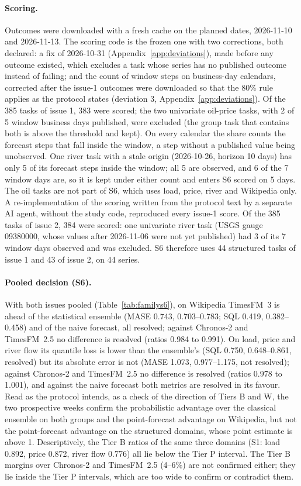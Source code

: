 \paragraph{Scoring.} Outcomes were downloaded with a fresh cache on the planned dates, 2026-11-10 and 2026-11-13. The scoring code is the
frozen one with two corrections, both declared: a fix of 2026-10-31 (Appendix~\ref{app:deviations}), made before any outcome existed, which excludes a task whose
series has no published outcome instead of failing; and the count of window steps on business-day calendars, corrected after the
issue-1 outcomes were downloaded so that the 80\% rule applies as the protocol states (deviation 3, Appendix~\ref{app:deviations}).
Of the 385 tasks of issue 1, 383 were scored; the two univariate oil-price tasks, with 2 of 5 window business days published, were
excluded (the group task that contains both is above the threshold and kept). On
every calendar the share counts the forecast steps that fall inside the window, a step without a published value being
unobserved. One river task with a stale origin (2026-10-26, horizon 10 days) has only 5 of its forecast steps inside the window;
all 5 are observed, and 6 of the 7 window days are, so it is kept under either count and enters S6 scored on 5 days. The oil tasks
are not part of S6, which uses load, price, river and Wikipedia only. A re-implementation of the scoring written from the protocol
text by a separate AI agent, without the study code, reproduced every issue-1 score. Of the 385 tasks of issue 2, 384 were
scored: one univariate river task (USGS gauge 09380000, whose values after 2026-11-06 were not yet published) had 3 of its 7
window days observed and was excluded. S6 therefore uses 44 structured tasks of issue 1 and 43 of issue 2, on 44 series.

\paragraph{Pooled decision (S6).} With both issues pooled (Table~\ref{tab:familys6}), on Wikipedia TimesFM~3 is ahead of the
statistical ensemble (MASE 0.743, 0.703--0.783; SQL 0.419, 0.382--0.458) and of the naive forecast, all resolved; against
Chronos-2 and TimesFM~2.5 no difference is resolved (ratios 0.984 to 0.991). On load, price and river flow its quantile loss is lower than the
ensemble's (SQL 0.750, 0.648--0.861, resolved) but its absolute error is not (MASE 1.073, 0.977--1.175, not resolved); against
Chronos-2 and TimesFM~2.5 no difference is resolved (ratios 0.978 to 1.001), and against the naive forecast both metrics are
resolved in its favour. Read as the protocol intends, as a check of the direction of Tiers B and W, the two prospective weeks confirm the
probabilistic advantage over the classical ensemble on both groups and the point-forecast advantage on Wikipedia, but not the
point-forecast advantage on the structured domains, whose point estimate is above 1. Descriptively, the Tier B ratios of the same
three domains (S1: load 0.892, price 0.872, river flow 0.776) all lie below the Tier P interval. The Tier B margins over Chronos-2
and TimesFM~2.5 (4--6\%) are not confirmed either; they lie inside the Tier P intervals, which are too wide to confirm or
contradict them.

